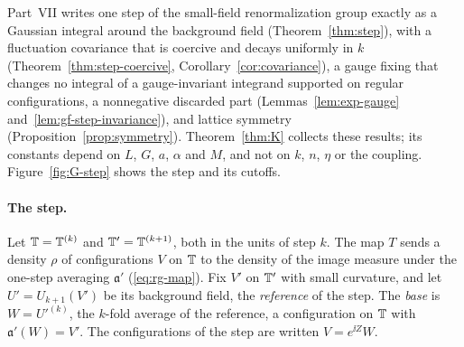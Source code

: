 \label{g:step}

Part~VII writes one step of the small-field renormalization group exactly as a Gaussian integral around the background field (Theorem~\ref{thm:step}), with a fluctuation covariance that is coercive and decays uniformly in $k$ (Theorem~\ref{thm:step-coercive}, Corollary~\ref{cor:covariance}), a gauge fixing that changes no integral of a gauge-invariant integrand supported on regular configurations, a nonnegative discarded part (Lemmas~\ref{lem:exp-gauge} and~\ref{lem:gf-step-invariance}), and lattice symmetry (Proposition~\ref{prop:symmetry}). Theorem~\ref{thm:K} collects these results; its constants depend on $L$, $G$, $a$, $\alpha$ and $M$, and not on $k$, $n$, $\eta$ or the coupling. Figure~\ref{fig:G-step} shows the step and its cutoffs.



\paragraph{The step.} Let $\mathbb T=\mathbb T^{(k)}$ and $\mathbb T'=\mathbb T^{(k+1)}$, both in the units of step $k$. The map $T$ sends a density $\rho$ of configurations $V$ on $\mathbb T$ to the density of the image measure under the one-step averaging $\mathfrak a'$ (\eqref{eq:rg-map}). Fix $V'$ on $\mathbb T'$ with small curvature, and let $U'=U_{k+1}(V')$ be its background field, the \emph{reference} of the step. The \emph{base} is $W=U'^{(k)}$, the $k$-fold average of the reference, a configuration on $\mathbb T$ with $\mathfrak a'(W)=V'$. The configurations of the step are written $V=e^{\ii Z}W$.

